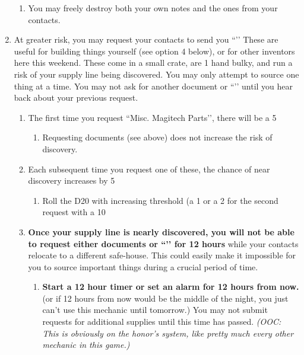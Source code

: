 \documentclass[green]{GL2020}
\begin{document}
\begin{enumerate}
\begin{enumerate}
    \item You may freely destroy both your own notes and the ones from your contacts.
  \end{enumerate}
  \item At greater risk, you may request your contacts to send you ``\iMagitechParts{}’’ These are useful for building things yourself (see option 4 below), or for other inventors here this weekend. These come in a small crate, are 1 hand bulky, and run a risk of your supply line being discovered. You may only attempt to source one thing at a time. You may not ask for another document or ``\iMagitechParts{}’’ until you hear back about your previous request.
  \begin{enumerate}
    \item The first time you request ``Misc. Magitech Parts’’, there will be a 5%
    \begin{enumerate}
       \item Requesting documents (see above) does not increase the risk of discovery.
    \end{enumerate}
    \item Each subsequent time you request one of these, the chance of near discovery increases by 5%
    \begin{enumerate}
       \item Roll the D20 with increasing threshold (a 1 or a 2 for the second request with a 10%
    \end{enumerate}
    \item \textbf{Once your supply line is nearly discovered, you will not be able to request either documents or ``\iMagitechParts{}’’ for 12 hours} while your contacts relocate to a different safe-house. This could easily make it impossible for you to source important things during a crucial period of time. 
    \begin{enumerate}
      \item \textbf{Start a 12 hour timer or set an alarm for 12 hours from now.} (or if 12 hours from now would be the middle of the night, you just can’t use this mechanic until tomorrow.) You may not submit requests for additional supplies until this time has passed. \emph{(OOC: This is obviously on the honor’s system, like pretty much every other mechanic in this game.)}
    \end{enumerate}

\end{enumerate}
\end{enumerate}
\end{document}
